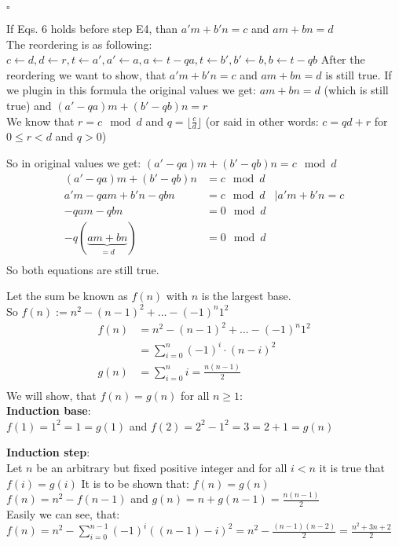 $\square$


If Eqs. 6 holds before step E4, than $a'm+b'n = c$ and $am+bn = d$ \\
The reordering is as following: $c \leftarrow d, d \leftarrow r, t \leftarrow a', a' \leftarrow a, a \leftarrow t -qa, t \leftarrow  b', b' \leftarrow b, b \leftarrow t-qb$
After the reordering we want to show, that $a'm+b'n = c$ and $am+bn = d$ is still true.
If we plugin in this formula the original values we get:
$am + bn = d$ (which is still true) and $(a'-qa)m + (b'-qb)n = r$ \\
We know that $r = c \mod d$ and $q = \lfloor \frac cd \rfloor$ (or said in other words: $c = qd + r$ for $0 \leq r < d$ and $q > 0$)

So in original values we get: $(a'-qa)m + (b'-qb)n = c \mod d$
\begin{align*}
    (a'-qa)m + (b'-qb)n         & = c \mod d                  \\
    a'm-qam +b'n -qbn           & = c \mod d & | a'm +b'n = c \\
    -qam-qbn                    & = 0 \mod d                  \\
    -q(\underbrace{am+bn}_{=d}) & = 0 \mod d                  \\
\end{align*}
So both equations are still true.

Let the sum be known as $f(n)$ with $n$ is the largest base. \\
So $f(n) := n^2 - (n-1)^2 + ... - (-1)^n 1^2$
\begin{align*}
    f(n) & = n^2 - (n-1)^2 + ... - (-1)^n 1^2       \\
         & = \sum_{i = 0}^{n} (-1)^{i}\cdot (n-i)^2 \\
    g(n) & = \sum_{i=0}^{n} i = \frac{n(n-1)}{2}    \\
\end{align*}
We will show, that $f(n) = g(n)$ for all $n \geq 1$: \\

\textbf{Induction base}: \\
$f(1) = 1^2 = 1 = g(1)$ and $f(2) = 2^2-1^2 = 3 = 2+1 = g(n)$

\textbf{Induction step}: \\
Let $n$ be an arbitrary but fixed positive integer and for all $i < n$ it is true that $f(i) = g(i)$
It is to be shown that: $f(n) = g(n)$ \\
$f(n) = n^2 - f(n-1)$ and $g(n) = n + g(n-1) = \frac{n(n-1)}{2}$ \\
Easily we can see, that: $f(n) = n^2 - \sum_{i=0}^{n-1}(-1)^i ((n-1)-i)^2 = n^2 -\frac{(n-1)(n-2)}{2} = \frac{n^2+3n+2}{2}$

